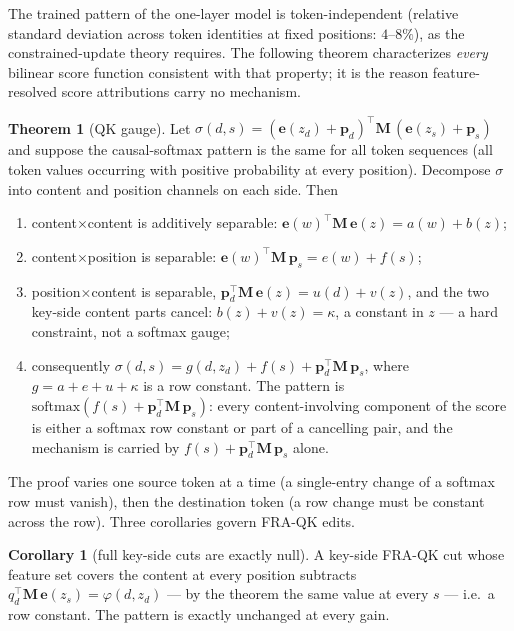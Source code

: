 \documentclass{article}
\newcommand{\pb}{\boldsymbol{p}}
\newcommand{\eb}{\boldsymbol{e}}
\newcommand{\Mb}{\boldsymbol{M}}
\newcommand{\softmax}[1]{\textrm{softmax}(#1)}
\theoremstyle{definition}
\newtheorem{theorem}{Theorem}[section]
\newtheorem{corollary}{Corollary}
\begin{document}
The trained pattern of the one-layer model is token-independent (relative
standard deviation across token identities at fixed positions: $4$--$8\%$),
as the constrained-update theory requires. The following theorem
characterizes \emph{every} bilinear score function consistent with that
property; it is the reason feature-resolved score attributions carry no
mechanism.

\begin{theorem}[QK gauge]\label{thm:gauge}
Let $\sigma(d,s) = (\eb(z_d)+\pb_d)^\top \Mb\, (\eb(z_s)+\pb_s)$ and suppose
the causal-softmax pattern is the same for all token sequences (all token
values occurring with positive probability at every position). Decompose
$\sigma$ into content and position channels on each side. Then
\begin{enumerate}
\item content$\times$content is additively separable:
$\eb(w)^\top\Mb\,\eb(z) = a(w) + b(z)$;
\item content$\times$position is separable:
$\eb(w)^\top\Mb\,\pb_s = e(w) + f(s)$;
\item position$\times$content is separable,
$\pb_d^\top\Mb\,\eb(z) = u(d) + v(z)$, and the two key-side content parts
cancel: $b(z) + v(z) = \kappa$, a constant in $z$ --- a hard constraint, not
a softmax gauge;
\item consequently
$\sigma(d,s) = g(d, z_d) + f(s) + \pb_d^\top\Mb\,\pb_s$, where
$g = a + e + u + \kappa$ is a row constant. The pattern is
$\softmax{f(s) + \pb_d^\top\Mb\,\pb_s}$: every content-involving component
of the score is either a softmax row constant or part of a cancelling pair,
and the mechanism is carried by $f(s) + \pb_d^\top\Mb\,\pb_s$ alone.
\end{enumerate}
\end{theorem}

The proof varies one source token at a time (a single-entry change of a
softmax row must vanish), then the destination token (a row change must be
constant across the row). Three corollaries govern FRA-QK edits.

\begin{corollary}[full key-side cuts are exactly null]\label{cor:fullcut}
A key-side FRA-QK cut whose feature set covers the content at every position
subtracts $q_d^\top\Mb\,\eb(z_s) = \varphi(d, z_d)$ --- by the theorem the
same value at every $s$ --- i.e.\ a row constant. The pattern is exactly
unchanged at every gain.
\end{corollary}
\end{document}
